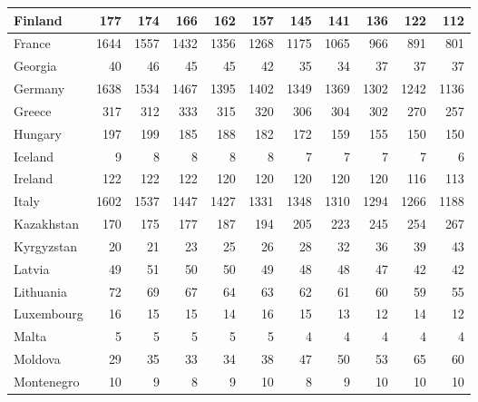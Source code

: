 \begin{table}
\begin{tabular}{|l|r|r|r|r|r|r|r|r|r|r|}
                       Finland&    177&    174&    166&    162&    157&    145&    141&    136&    122&    112\\\hline
                        France&   1644&   1557&   1432&   1356&   1268&   1175&   1065&    966&    891&    801\\\hline
                       Georgia&     40&     46&     45&     45&     42&     35&     34&     37&     37&     37\\\hline
                       Germany&   1638&   1534&   1467&   1395&   1402&   1349&   1369&   1302&   1242&   1136\\\hline
                        Greece&    317&    312&    333&    315&    320&    306&    304&    302&    270&    257\\\hline
                       Hungary&    197&    199&    185&    188&    182&    172&    159&    155&    150&    150\\\hline
                       Iceland&      9&      8&      8&      8&      8&      7&      7&      7&      7&      6\\\hline
                       Ireland&    122&    122&    122&    120&    120&    120&    120&    120&    116&    113\\\hline
                         Italy&   1602&   1537&   1447&   1427&   1331&   1348&   1310&   1294&   1266&   1188\\\hline
                    Kazakhstan&    170&    175&    177&    187&    194&    205&    223&    245&    254&    267\\\hline
                    Kyrgyzstan&     20&     21&     23&     25&     26&     28&     32&     36&     39&     43\\\hline
                        Latvia&     49&     51&     50&     50&     49&     48&     48&     47&     42&     42\\\hline
                     Lithuania&     72&     69&     67&     64&     63&     62&     61&     60&     59&     55\\\hline
                    Luxembourg&     16&     15&     15&     14&     16&     15&     13&     12&     14&     12\\\hline
                         Malta&      5&      5&      5&      5&      5&      4&      4&      4&      4&      4\\\hline
                       Moldova&     29&     35&     33&     34&     38&     47&     50&     53&     65&     60\\\hline
                    Montenegro&     10&      9&      8&      9&     10&      8&      9&     10&     10&     10\\\hline

\end{tabular}
\end{table}
